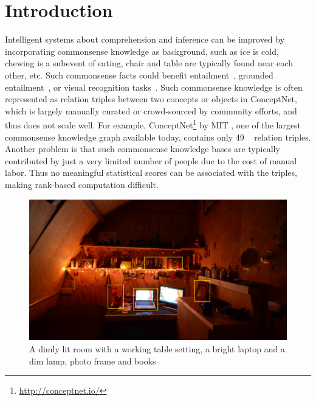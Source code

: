 \section{Introduction}
Intelligent systems about comprehension and inference 
can be improved by incorporating commonsense knowledge as background, 
such as ice is cold, 
chewing is a subevent of eating, 
chair and table are typically found near each other, etc. 
Such commonsense facts could benefit entailment~\cite{dagan2009recognizing}, grounded entailment~\cite{bowman2015large}, or visual recognition tasks~\cite{zhu2014reasoning}.
Such commonsense knowledge is often represented as relation triples
between two concepts or objects in ConceptNet,
which is largely manually curated
or crowd-sourced by community efforts, and thus does not scale well.
For example, ConceptNet\footnote{\url{http://conceptnet.io/}} by MIT \cite{speer2012representing}, one of the largest commonsense
knowledge graph available today, contains only 49 \lnear~
relation triples. 
Another problem is that such commonsense knowledge bases are typically contributed by just a very limited number of people due to the cost of manual labor. 
Thus no meaningful statistical scores can be
associated with the triples, making rank-based 
computation difficult. 
%
\begin{figure}[th]
\center
\includegraphics[width=0.9\columnwidth]{dim-room.jpg}
\caption{A dimly lit room with a working table setting, a bright laptop and a dim lamp, photo frame and books}
\label{fig:dim}
\end{figure}

